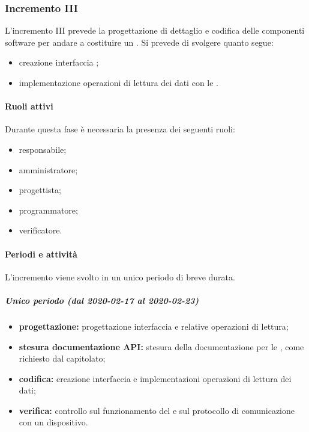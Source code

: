 
		\subsubsection{Incremento III}
			
			L'incremento III prevede la progettazione di dettaglio e codifica delle componenti software per andare a costituire un . Si prevede di svolgere quanto segue:
			\begin{itemize}
				\item creazione interfaccia ;
				\item implementazione operazioni di lettura dei dati con le .
			\end{itemize}
			
			\paragraph{Ruoli attivi}
			
				Durante questa fase è necessaria la presenza dei seguenti ruoli:
				\begin{itemize}
					\item responsabile;
					\item amministratore;
					\item progettista;
					\item programmatore;
					\item verificatore.
				\end{itemize}
			
			\paragraph{Periodi e attività}
			
				L'incremento viene svolto in un unico periodo di breve durata.
				
				\subparagraph{Unico periodo (dal 2020-02-17 al 2020-02-23)}
				
					\begin{itemize}
						\item \textbf{progettazione:} progettazione interfaccia  e relative operazioni di lettura;
						\item \textbf{stesura documentazione API:} stesura della documentazione per le , come richiesto dal capitolato;
						\item \textbf{codifica:} creazione interfaccia  e implementazioni operazioni di lettura dei dati;
						\item \textbf{verifica:} controllo sul funzionamento del  e sul protocollo di comunicazione con un dispositivo.
					\end{itemize} 			

